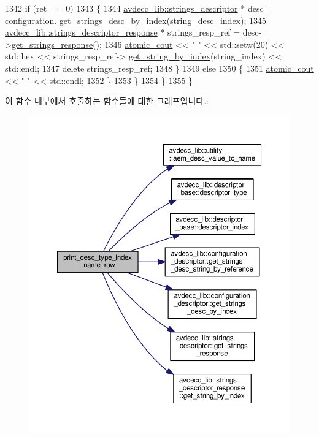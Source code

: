 \begin{DoxyCode}
1342             \textcolor{keywordflow}{if} (ret == 0)
1343             \{
1344                 \hyperlink{classavdecc__lib_1_1strings__descriptor}{avdecc\_lib::strings\_descriptor} * desc = configuration.
      \hyperlink{classavdecc__lib_1_1configuration__descriptor_a34531c290e12e85895a804c067e9919e}{get\_strings\_desc\_by\_index}(string\_desc\_index);
1345                 \hyperlink{classavdecc__lib_1_1strings__descriptor__response}{avdecc\_lib::strings\_descriptor\_response} * 
      strings\_resp\_ref = desc->\hyperlink{classavdecc__lib_1_1strings__descriptor_a313776812dd7fa955eb6e60c9c92956a}{get\_strings\_response}();
1346                 \hyperlink{cmd__line_8h_a0bc38ccc65c79ba06c6fcd7b4bf554c3}{atomic\_cout} << \textcolor{stringliteral}{"   "} << std::setw(20) << std::hex << strings\_resp\_ref->
      \hyperlink{classavdecc__lib_1_1strings__descriptor__response_ae8f3e50f4e5051488a864fd8acc6da31}{get\_string\_by\_index}(string\_index) << std::endl;
1347                 \textcolor{keyword}{delete} strings\_resp\_ref;
1348             \}
1349             \textcolor{keywordflow}{else}
1350             \{
1351                 \hyperlink{cmd__line_8h_a0bc38ccc65c79ba06c6fcd7b4bf554c3}{atomic\_cout} << \textcolor{stringliteral}{"   "} << std::endl;
1352             \}
1353         \}
1354     \}
1355 \}
\end{DoxyCode}


이 함수 내부에서 호출하는 함수들에 대한 그래프입니다.\+:
\nopagebreak
\begin{figure}[H]
\begin{center}
\leavevmode
\includegraphics[width=350pt]{classcmd__line_ac47c21c03b69593b74e7c43201d0ba41_cgraph}
\end{center}
\end{figure}





